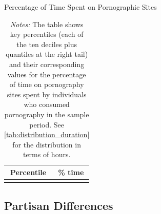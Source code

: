 \documentclass[12pt, letterpaper]{article}
\begin{document}
\begin{table}[ht] \centering \small \setlength\tabcolsep{10 pt}
	\caption{Percentage of Time Spent on Pornographic Sites}
	\label{tab:distribution_prop_duration}
	\begin{adjustbox}{max width=\textwidth}
		\begin{tabular}{cr}
			\toprule
			\multicolumn{1}{c}{\textbf{Percentile}}&\multicolumn{1}{c}{\textbf{\% time}}\\
			\midrule
			\\
			\bottomrule
		\end{tabular}
	\end{adjustbox}
	\caption*{\footnotesize \emph{Notes:} 
		The table shows key percentiles (each of the ten deciles plus quantiles at the right tail) and their corresponding values for the percentage of time on pornography sites spent by individuals who consumed pornography in the sample period. 
		See \cref{tab:distribution_duration} for the distribution in terms of hours.
	}
\end{table}

\FloatBarrier
\clearpage
\subsection{Partisan Differences}
\end{document}

